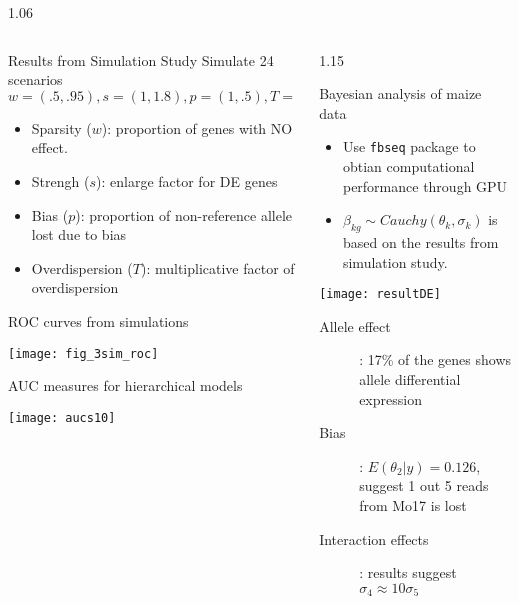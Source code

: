 \documentclass[final]{beamer}
\newlength{\onecolwid}
\newlength{\twocolwid}
\newlength{\threecolwid}
\begin{document}
\begin{frame}
\begin{columns}[t,totalwidth=\threecolwid]
\begin{column}{1.06\twocolwid}
\begin{columns}[t, totalwidth = 1.06\twocolwid]
\begin{column}{\onecolwid}
\begin{alertblock}{Results from Simulation Study}
Simulate 24 scenarios $w = (.5, .95), s = (1, 1.8), p = (1, .5), T= (0.25, 1, 4)$
  \begin{itemize}
  \item Sparsity ($w$): proportion of genes with NO effect.
  \item Strengh ($s$): enlarge factor for DE genes
  \item Bias ($p$): proportion of non-reference allele lost due to bias
  \item Overdispersion ($T$): multiplicative factor of overdispersion
  \end{itemize}
  
\vspace{.5cm}

ROC curves from simulations  
\begin{center}
\texttt{[image: fig\_3sim\_roc]} \\
\end{center}

AUC measures for hierarchical models
\begin{center}
\texttt{[image: aucs10]}
\end{center}
  
\end{alertblock}
\end{column} %


\begin{column}{1.15\onecolwid}
\begin{alertblock}{Bayesian analysis of maize data}

\begin{itemize}
\item Use {\tt fbseq} package to obtian computational performance through GPU
\item $\beta_{kg} \sim Cauchy(\theta_{k}, \sigma_{k})$ is based on the results from simulation study.
\end{itemize}

\begin{center}
\texttt{[image: resultDE]}
\end{center}

\begin{description}
\item[Allele effect]:  17\% of the genes shows allele differential expression
\item[Bias]: $E(\theta_2\vert y) = 0.126$, suggest 1 out 5 reads from Mo17 is lost
\item[Interaction effects]: results suggest $\sigma_4 \approx 10 \sigma_5$
\end{description}


\end{alertblock}
\end{column}
\end{columns}
\end{column}
\end{columns}
\end{frame}
\end{document}
